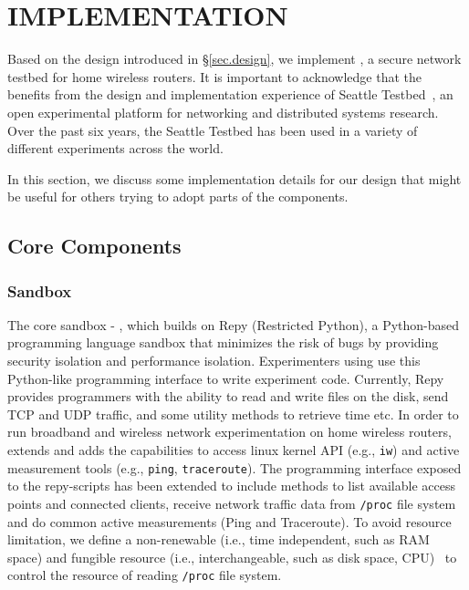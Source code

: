 \chapter{IMPLEMENTATION} 
\label{sec.implementation}
Based on the design introduced in \S{\ref{sec.design}}, we implement \sysname, a secure network testbed for home wireless routers. It is important to acknowledge that the \sysname benefits from the design and implementation experience of Seattle Testbed~\cite{cappos2009seattle}, an open experimental platform for networking and distributed systems research. Over the past six years, the Seattle Testbed has been used in a variety of different experiments across the world. 

In this section, we discuss some implementation details for our design that might be useful for others trying to adopt parts of the components.

\section{Core Components}
\subsection{Sandbox}
\label{sec.sandbox}
The core sandbox - \sandboxname, which builds on Repy (Restricted Python), a Python-based programming language sandbox that minimizes the risk of bugs by providing security isolation and performance isolation. Experimenters using \sysname use this Python-like programming interface to write experiment code. Currently, Repy provides programmers with the ability to read and write files on the disk, send TCP and UDP traffic, and some utility methods to retrieve time etc. In order to run broadband and wireless network experimentation on home wireless routers, \sysname extends and adds the capabilities to access linux kernel API (e.g., \texttt{iw}) and active measurement tools (e.g., \texttt{ping}, \texttt{traceroute}). The programming interface exposed to the repy-scripts has been extended to include methods to list available access points and connected clients, receive network traffic data from \texttt{/proc} file system and do common active measurements (Ping and Traceroute). To avoid resource limitation, we define a non-renewable (i.e., time independent, such as RAM space) and fungible resource (i.e., interchangeable, such as disk space, CPU)~\cite{li2015fence} to control the resource of reading \texttt{/proc} file system. 

